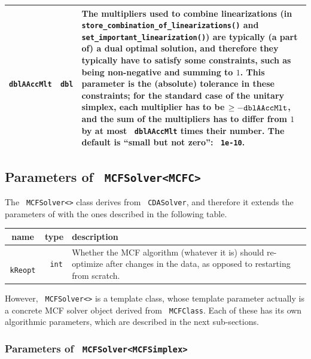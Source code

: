 \documentclass[a4paper]{article}
\newcommand{\code}[1]{\textrm{\texttt{\hyphenchar\font=200 #1}}}
\begin{document}
\begin{longtable}{|c|c|p{13.5cm}|}
 \hline
 \code{dblAAccMlt} & \code{dbl} & The multipliers used to combine linearizations (in \code{store\_\-combination\_\-of\_\-linearizations()} and \code{set\_\-important\_\-linearization()}) are typically (a part of) a dual optimal solution, and therefore they typically have to satisfy some constraints, such as being non-negative and summing to $1$. This parameter is the (absolute) tolerance in these constraints; for the standard case of the unitary simplex, each multiplier has to be $\geq - \code{dblAAccMlt}$, and the sum of the multipliers has to differ from $1$ by at most \code{dblAAccMlt} times their number. The default is ``small but not zero'': \code{1e-10}. \\
 \hline
\end{longtable}

\subsection{Parameters of \code{MCFSolver<MCFC>}}

The \code{MCFSolver<>} class derives from \code{CDASolver}, and therefore it extends the parameters of with the ones described in the following table.


\begin{longtable}{|c|c|p{14.5cm}|}
 \hline
 name & type & description \\
 \hline
 \code{kReopt} & \code{int} & Whether the MCF algorithm (whatever it is) should re-optimize after changes in the data, as opposed to restarting from scratch.\\
 \hline
\end{longtable}

However, \code{MCFSolver<>} is a template class, whose template parameter actually is a concrete MCF solver object derived from \code{MCFClass}. Each of these has its own algorithmic parameters, which are described in the next sub-sections.

\subsubsection{Parameters of \code{MCFSolver<MCFSimplex>}}
\end{document}
